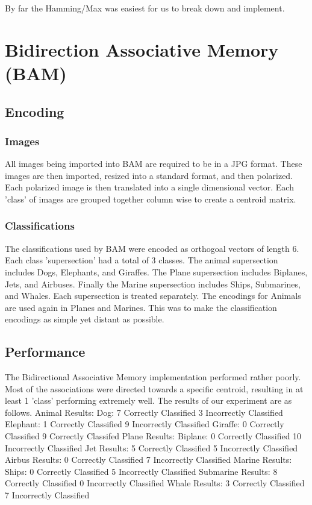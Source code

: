 \documentclass{article}
\begin{document}
By far the Hamming/Max was easiest for us to break down and implement.



\section{Bidirection Associative Memory (BAM)}

\subsection{Encoding}
\subsubsection{Images}
All images being imported into BAM are required to be in a JPG format. These
images are then imported, resized into a standard format, and then polarized.
Each polarized image is then translated into a single dimensional vector.
Each 'class' of images are grouped together column wise to create a centroid
matrix.

\subsubsection{Classifications}
The classifications used by BAM were encoded as orthogoal vectors of length 6.
Each class 'supersection' had a total of 3 classes. The animal supersection
includes Dogs, Elephants, and Giraffes. The Plane supersection includes Biplanes,
Jets, and Airbuses. Finally the Marine supersection includes Ships, Submarines,
and Whales. Each supersection is treated separately. The encodings for Animals
are used again in Planes and Marines. This was to make the classification
encodings as simple yet distant as possible.
\subsection{Performance}
The Bidirectional Associative Memory implementation performed rather poorly.
Most of the associations were directed towards a specific centroid, resulting
in at least 1 'class' performing extremely well. The results of our
experiment are as follows.
Animal Results:
    Dog:
        7 Correctly Classified
        3 Incorrectly Classified
    Elephant:
        1 Correctly Classified
        9 Incorrectly Classified
    Giraffe:
        0 Correctly Classified
        9 Correctly Classifed
Plane Results:
    Biplane:
        0 Correctly Classified
        10 Incorrectly Classified
    Jet Results:
        5 Correctly Classified
        5 Incorrectly Classified
    Airbus Results:
        0 Correctly Classified
        7 Incorrectly Classified
Marine Results:
    Ships:
        0 Correctly Classified
        5 Incorrectly Classified
    Submarine Results:
        8 Correctly Classified
        0 Incorrectly Classified
    Whale Results:
        3 Correctly Classified
        7 Incorrectly Classified
\end{document}
